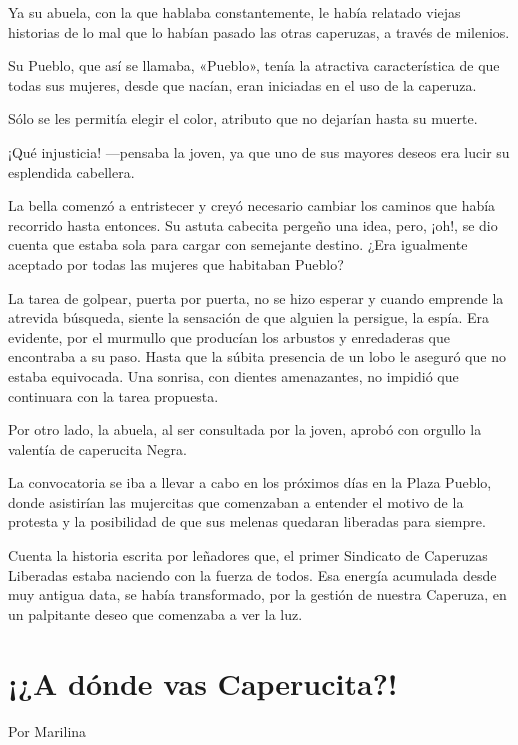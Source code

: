 \documentclass[11pt,twoside,openright,a5paper]{book}
\begin{document}
Ya su abuela, con la que hablaba constantemente, le había relatado viejas historias de lo mal que lo habían pasado las otras caperuzas, a través de milenios.

Su Pueblo, que así se llamaba, «Pueblo», tenía la atractiva característica de que todas sus mujeres, desde que nacían, eran iniciadas en el uso de la caperuza.

Sólo se les permitía elegir el color, atributo que no dejarían hasta su muerte.

¡Qué injusticia! ---pensaba la joven, ya que uno de sus mayores deseos era lucir su esplendida cabellera.

La bella comenzó a entristecer y creyó necesario cambiar los caminos que había recorrido hasta entonces.
Su astuta cabecita pergeño una idea, pero, ¡oh!, se dio cuenta que estaba sola para cargar con semejante destino. ¿Era igualmente aceptado por todas las mujeres que habitaban Pueblo?

La tarea de golpear, puerta por puerta, no se hizo esperar y cuando emprende la atrevida búsqueda, siente la sensación de que alguien la persigue, la espía. Era evidente, por el murmullo que producían los arbustos y enredaderas que encontraba a su paso. Hasta que la súbita presencia de un lobo le aseguró que no estaba equivocada. Una sonrisa, con dientes amenazantes, no impidió que continuara con la tarea propuesta.

Por otro lado, la abuela, al ser consultada por la joven, aprobó con orgullo la valentía de caperucita Negra.

La convocatoria se iba a llevar a cabo en los próximos días en la Plaza Pueblo, donde asistirían las mujercitas que comenzaban a entender el motivo de la protesta y la posibilidad de que sus melenas quedaran liberadas para siempre.

Cuenta la historia escrita por leñadores que, el primer Sindicato de Caperuzas Liberadas estaba naciendo con la fuerza de todos. Esa energía acumulada desde muy antigua data, se había transformado, por la gestión de nuestra Caperuza, en un palpitante deseo que comenzaba a ver la luz.


\section*{¡¿A dónde vas Caperucita?!}

\begin{flushright}Por Marilina\end{flushright}
\end{document}
